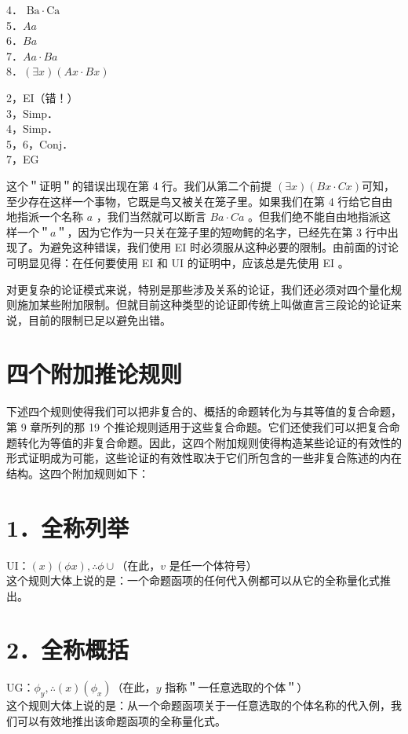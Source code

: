 4． $\mathrm{Ba} \cdot \mathrm{Ca}$\\
5．$A a$\\
6．$B a$\\
7．$A a \cdot B a$\\
8．$(\exists x)(A x \cdot B x)$

2，EI（错！）\\
3，Simp．\\
4，Simp．\\
5，6，Conj．\\
7，EG

这个＂证明＂的错误出现在第 4 行。我们从第二个前提 $(\exists x)(B x \cdot C x)$可知，至少存在这样一个事物，它既是鸟又被关在笼子里。如果我们在第 4 行给它自由地指派一个名称 $a$ ，我们当然就可以断言 $B a \cdot C a$ 。但我们绝不能自由地指派这样一个＂$a$＂，因为它作为一只关在笼子里的短吻鳄的名字，已经先在第 3 行中出现了。为避免这种错误，我们使用 EI 时必须服从这种必要的限制。由前面的讨论可明显见得：在任何要使用 EI 和 UI 的证明中，应该总是先使用 EI 。

对更复杂的论证模式来说，特别是那些涉及关系的论证，我们还必须对四个量化规则施加某些附加限制。但就目前这种类型的论证即传统上叫做直言三段论的论证来说，目前的限制已足以避免出错。

\section*{四个附加推论规则}
下述四个规则使得我们可以把非复合的、概括的命题转化为与其等值的复合命题，第 9 章所列的那 19 个推论规则适用于这些复合命题。它们还使我们可以把复合命题转化为等值的非复合命题。因此，这四个附加规则使得构造某些论证的有效性的形式证明成为可能，这些论证的有效性取决于它们所包含的一些非复合陈述的内在结构。这四个附加规则如下：

\section*{1．全称列举}
UI：$(x)(\phi x), \therefore \phi \cup$（在此，$v$ 是任一个体符号）\\
这个规则大体上说的是：一个命题函项的任何代入例都可以从它的全称量化式推出。

\section*{2．全称概括}
UG：$\phi_{y}, \therefore(x)\left(\phi_{x}\right)$（在此，$y$ 指称＂一任意选取的个体＂）\\
这个规则大体上说的是：从一个命题函项关于一任意选取的个体名称的代入例，我们可以有效地推出该命题函项的全称量化式。

